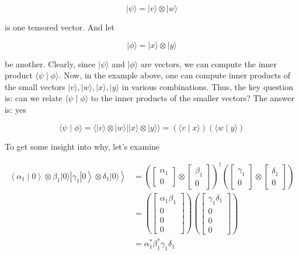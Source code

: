 \documentclass[main.tex]{subfiles}
\begin{document}
    $$
    |\psi\rangle=|v\rangle \otimes|w\rangle
    $$
    
    is one tensored vector. And let
    
    $$
    |\phi\rangle=|x\rangle \otimes|y\rangle
    $$
    
    be another. Clearly, since $|\psi\rangle$ and $|\phi\rangle$ are vectors, we can compute the inner product
    $\langle\psi \mid \phi\rangle$. Now, in the example above, one can compute inner products of the small vectors $|v\rangle,|w\rangle,|x\rangle,|y\rangle$ in various combinations. Thus, the key question is: can we relate $\langle\psi \mid \phi\rangle$ to the inner products of the smaller vectors? The answer is: yes
    
    $$
    \langle\psi \mid \phi\rangle=\langle\mid v\rangle \otimes|w\rangle|| x\rangle \otimes|y\rangle\rangle=(\langle v \mid x\rangle)(\langle w \mid y\rangle)
    $$
    
    To get some insight into why, let's examine
    
    $$
    \begin{aligned}
    \left.\left.\left\langle\alpha_{1} \mid 0\right\rangle \otimes \beta_{1}|0\rangle\left|\gamma_{1}\right| 0\right\rangle \otimes \delta_{1}|0\rangle\right\rangle &=\left(\left[\begin{array}{c}
    \alpha_{1} \\
    0
    \end{array}\right] \otimes\left[\begin{array}{c}
    \beta_{1} \\
    0
    \end{array}\right]\right)^{\dagger}\left(\left[\begin{array}{c}
    \gamma_{1} \\
    0
    \end{array}\right] \otimes\left[\begin{array}{c}
    \delta_{1} \\
    0
    \end{array}\right]\right) \\
    &=\left(\left[\begin{array}{c}
    \alpha_{1} \beta_{1} \\
    0 \\
    0 \\
    0
    \end{array}\right]\right)\left(\left[\begin{array}{c}
    \gamma_{1} \delta_{1} \\
    0 \\
    0 \\
    0
    \end{array}\right]\right) \\
    &=\alpha_{1}^{*} \beta_{1}^{*} \gamma_{1} \delta_{1}
    \end{aligned}
    $$
    
\end{document}
